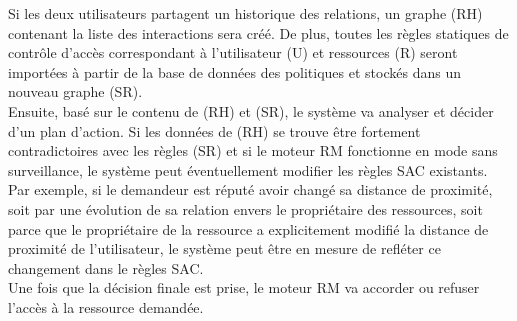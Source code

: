 \documentclass[a4paper]{article}
\begin{document}
Si les deux utilisateurs partagent un historique des relations, un graphe (RH) contenant la liste des interactions sera créé. De plus, toutes les règles statiques de contrôle d'accès correspondant à l'utilisateur (U) et ressources (R) seront importées à partir de la base de données des politiques et stockés dans un nouveau graphe (SR).\\


Ensuite, basé sur le contenu de (RH) et (SR), le système va analyser et décider d'un plan d'action. Si les données de (RH) se trouve être fortement contradictoires avec les règles (SR) et si le moteur RM fonctionne en mode sans surveillance, le système peut éventuellement modifier les règles SAC existants. Par exemple, si le demandeur est réputé avoir changé sa distance de proximité, soit par une évolution de sa relation envers le propriétaire des ressources, soit parce que le propriétaire de la ressource a explicitement modifié la distance de proximité de l'utilisateur, le système peut être en mesure de refléter ce changement dans le règles SAC.\\


Une fois que la décision finale est prise, le moteur RM va accorder ou refuser l'accès à la ressource demandée.
\end{document}
